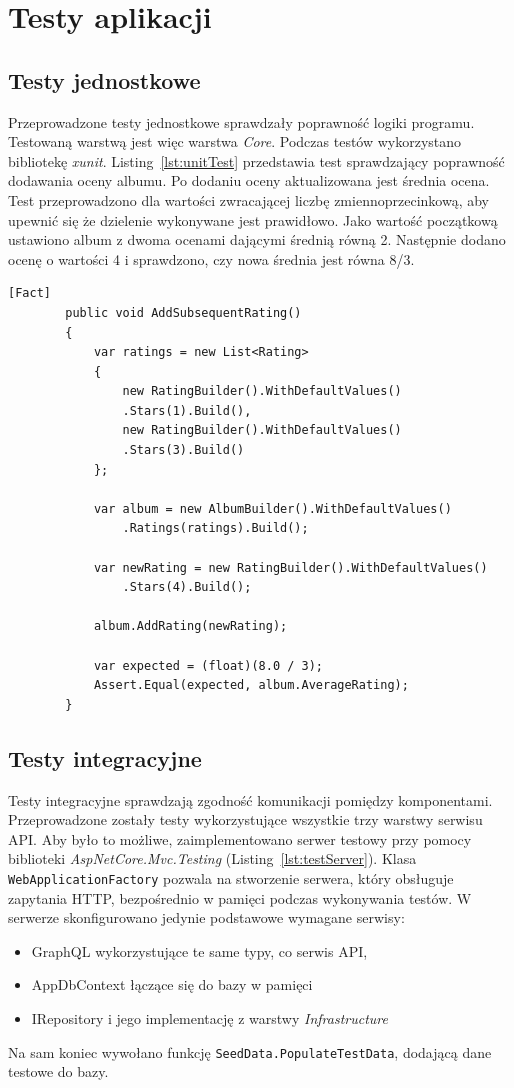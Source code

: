 \chapter{Testy aplikacji}
\section{Testy jednostkowe}
	Przeprowadzone testy jednostkowe sprawdzały poprawność logiki programu.
	Testowaną warstwą jest więc warstwa \emph{Core}.
	Podczas testów wykorzystano bibliotekę \emph{xunit}.
	Listing~\ref{lst:unitTest} przedstawia test sprawdzający poprawność dodawania oceny albumu.
	Po dodaniu oceny aktualizowana jest średnia ocena.
	Test przeprowadzono dla wartości zwracającej liczbę zmiennoprzecinkową, aby upewnić się że dzielenie wykonywane jest prawidłowo.
	Jako wartość początkową ustawiono album z dwoma ocenami dającymi średnią równą 2.
	Następnie dodano ocenę o wartości 4 i sprawdzono, czy nowa średnia jest równa 8/3.

	\begin{lstlisting}[label=lst:unitTest, caption=Test jednostkowy dodawania oceny albumu, float=h]
		[Fact]
		public void AddSubsequentRating()
		{
			var ratings = new List<Rating>
			{
				new RatingBuilder().WithDefaultValues()
				.Stars(1).Build(),
				new RatingBuilder().WithDefaultValues()
				.Stars(3).Build()
			};

			var album = new AlbumBuilder().WithDefaultValues()
				.Ratings(ratings).Build();

			var newRating = new RatingBuilder().WithDefaultValues()
				.Stars(4).Build();

			album.AddRating(newRating);

			var expected = (float)(8.0 / 3);
			Assert.Equal(expected, album.AverageRating);
		}
	\end{lstlisting}

\section{Testy integracyjne}
	Testy integracyjne sprawdzają zgodność komunikacji pomiędzy komponentami.
	Przeprowadzone zostały testy wykorzystujące wszystkie trzy warstwy serwisu API.
	Aby było to możliwe, zaimplementowano serwer testowy przy pomocy biblioteki \emph{AspNetCore.Mvc.Testing} (Listing~\ref{lst:testServer}).
	Klasa \verb|WebApplicationFactory| pozwala na stworzenie serwera, który obsługuje zapytania HTTP,
	bezpośrednio w pamięci podczas wykonywania testów.
	W serwerze skonfigurowano jedynie podstawowe wymagane serwisy:
	\begin{itemize}
		\item GraphQL wykorzystujące te same typy, co serwis API,
		\item AppDbContext łączące się do bazy w pamięci
		\item IRepository i jego implementację z warstwy \emph{Infrastructure}
	\end{itemize}
	Na sam koniec wywołano funkcję \verb|SeedData.PopulateTestData|, dodającą dane testowe do bazy.

